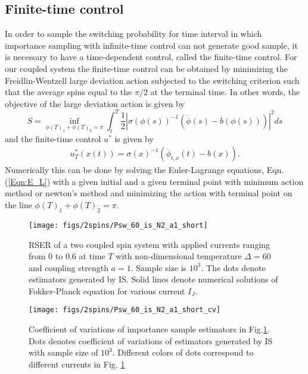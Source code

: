 \documentclass[journal,transmag]{IEEEtran}
\begin{document}
\subsection{Finite-time control}
In order to sample the switching probability for time interval in which importance sampling with infinite-time control can not generate good sample, it is necessary to have a time-dependent control, called the finite-time control. For our coupled system the finite-time control can be obtained by minimizing the Freidlin-Wentzell large deviation action subjected to the switching criterion such that the average spins equal to the $\pi/2$ at the terminal time. In other words, the objective of the large deviation action is given by
\begin{equation}
S =   \inf_{\phi(T)_1+ \phi(T)_2 =\pi} \int_t^T \frac{1}{2}| \sigma(\phi(s))^{-1}(\dot{\phi}(s) - b(\phi(s)))|^2 ds
\end{equation}
and the finite-time control $u^*$ is given by
\begin{align}
u^*_T(x(t)) = \sigma(x)^{-1}(\dot{\phi}_{t,x}(t) - b(x)).
\end{align}
Numerically this can be done by solving the Euler-Lagrange equations, Eqn.(\ref{Eqn:E_L}) with a given initial and a given terminal point with minimum action method or newton's method and minimizing the action with terminal point on the line $\phi(T)_1+ \phi(T)_2 =\pi$.

\begin{figure}[h]
   \centering
         \texttt{[image: figs/2spins/Psw\_60\_is\_N2\_a1\_short]}
   \caption{RSER of a two coupled spin system with applied currents ranging from $0$ to $0.6$ at time $T$ with non-dimensional temperature $\Delta = 60$ and coupling strength $ a = 1$. Sample size is $10^3$. The dots denote estimators generated by IS. Solid lines denote numerical solutions of Fokker-Planck equation for various current $I_J$. }
   \label{figs:ISvsMC1_short}
\end{figure}

\begin{figure}[h]
   \centering
         \texttt{[image: figs/2spins/Psw\_60\_is\_N2\_a1\_short\_cv]}
   \caption{Coefficient of variations of importance sample estimators in Fig.\ref{figs:ISvsMC1_short}. Dots denotes coefficient of variations of estimators generated by IS with sample size of $10^3$. Different colors of dots correspond to different currents in Fig. \ref{figs:ISvsMC1_short} }
   \label{figs:ISvsMC1_short_cv}
\end{figure}
\end{document}
